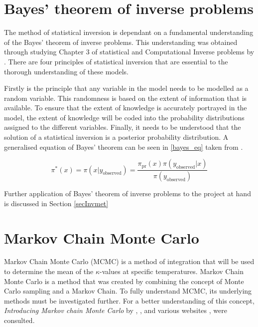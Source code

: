 %
%	

	
\section{Bayes' theorem of inverse problems}

	The method of statistical inversion is dependant on a fundamental understanding of the Bayes' theorem of inverse problems. 
	This understanding was obtained through studying Chapter 3 of statistical and Computational Inverse problems by \citet{Kaipo:2005}.
	There are four principles of statistical inversion that are essential to the thorough understanding of these models.

	Firstly is the principle that any variable in the model needs to be modelled as a random variable.
	This randomness is based on the extent of information that is available. 
	To ensure that the extent of knowledge is accurately portrayed in the model, the extent of knowledge will be coded into the probability distributions assigned to the different variables. 
	Finally, it needs to be understood that the solution of a statistical inversion is a posterior probability distribution.
	A generalised equation of Bayes' theorem can be seen in \ref{bayes_eq} taken from \citet{Kaipo:2005}.
	
	\begin{equation}
	\label{bayes_eq}
	\pi^*(x) = \pi(x|y_{\text{observed}}) = \frac{\pi_{\text{pr}}(x) \pi(y_{\text{observed}}|x)}{\pi (y_{\text{observed}})}	
	\end{equation}
	
Further application of Bayes' theorem of inverse problems to the project at hand is discussed in Section \ref{secInvmet}
\section{Markov Chain Monte Carlo} \label{MCMCdet}
Markov Chain Monte Carlo (MCMC) is a method of integration that will be used to determine the mean of the $\kappa$-values at specific temperatures. 
	Markov Chain Monte Carlo is a method that was created by combining the concept of Monte Carlo sampling  and a Markov Chain. 
	To fully understand MCMC, its underlying methods must be investigated further.
	For a better understanding of this concept, \textit{Introducing Markov chain Monte Carlo} by \citet{Gilks:1996}, \citet{Kaipo:2005}, and various websites \citet{MLM:2019}, \citet{dummies:2015} were consulted.
